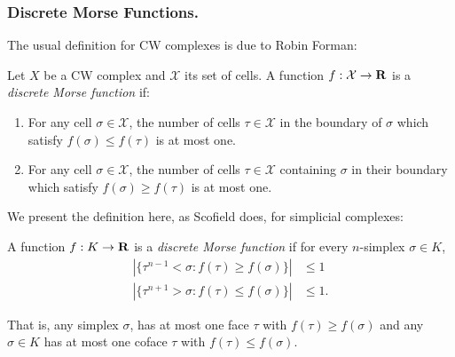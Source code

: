\subsubsection{Discrete Morse Functions.}

The usual definition for CW complexes is due to Robin Forman\autocite{morsecells}:
\begin{definition}
    Let $X$ be a CW complex and $\mathcal{X}$ its set of cells. A function $f : \mathcal{X} \to \mathbf{R}$ is a \emph{discrete Morse function} if:
    \begin{enumerate}
        \item For any cell $\sigma \in \mathcal{X}$, the number of cells $\tau \in \mathcal{X}$ in the boundary of $\sigma$ which satisfy
        $f(\sigma) \leq f(\tau)$ is at most one.
        \item For any cell $\sigma \in \mathcal{X}$, the number of cells $\tau \in \mathcal{X}$ containing $\sigma$ in their boundary which satisfy
        $f(\sigma) \geq f(\tau)$ is at most one.
    \end{enumerate}
\end{definition}

We present the definition here, as Scofield does, for simplicial complexes:

\begin{definition}
    A function $f : K \to \mathbf{R}$ is a \emph{discrete Morse function} if for every $n$-simplex $\sigma \in K$,
    \begin{align*}
        |\{\tau^{n-1} < \sigma : f(\tau) \geq f(\sigma)\}| &\leq 1 \\
        |\{\tau^{n+1} > \sigma : f(\tau) \leq f(\sigma)\}| &\leq 1.
    \end{align*}
\end{definition}
That is, any simplex $\sigma$, has at most one face $\tau$ with $f(\tau) \geq f(\sigma)$ and any $\sigma \in K$ has at most one coface
$\tau$ with $ f(\tau) \leq f(\sigma)$.

